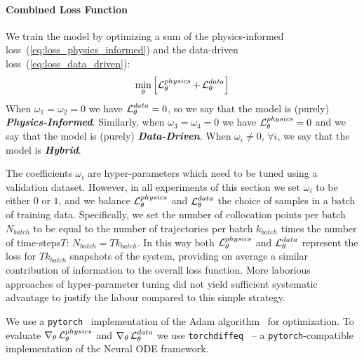\paragraph{Combined Loss Function} We train the model by optimizing a sum of the physics-informed loss~(\ref{eq:loss_physics_informed}) and the data-driven loss~(\ref{eq:loss_data_driven}):
\begin{equation}
    \label{eq:loss_combined}
    \min_\theta \left[\operatorname{\mathcal{L}}^{physics}_\theta + \operatorname{\mathcal{L}}^{data}_\theta\right]  
\end{equation}
When $\omega_1 = \omega_2 = 0$ we have $\operatorname{\mathcal{L}}^{data}_\theta = 0$, so we say that the model is (purely) \textit{\textbf{Physics-Informed}}. Similarly, when $\omega_3 = \omega_4 = 0$ we have $\operatorname{\mathcal{L}}^{physics}_\theta = 0$ and we say that the model is (purely) \textit{\textbf{Data-Driven}}. When $\omega_i \neq 0, \, \forall i$, we say that the model is \textit{\textbf{Hybrid}}. 

The coefficients $\omega_i$ are hyper-parameters which need to be tuned using a validation dataset. However, in all experiments of this section we set $\omega_i$ to be either $0$ or $1$, and we balance $\operatorname{\mathcal{L}}^{physics}_\theta$ and $\operatorname{\mathcal{L}}^{data}_\theta$ the choice of samples in a batch of training data. Specifically, we set the number of collocation points per batch $N_{batch}$ to be equal to the number of trajectories per batch $k_{batch}$ times the number of time-steps$T$: $N_{batch} = Tk_{batch}$. In this way both $\operatorname{\mathcal{L}}^{physics}_\theta$ and $\operatorname{\mathcal{L}}^{data}_\theta$ represent the loss for $Tk_{batch}$ snapshots of the system, providing on average a similar contribution of information to the overall loss function. More laborious approaches of hyper-parameter tuning did not yield sufficient systematic advantage to justify the labour compared to this simple strategy.

We use a \texttt{pytorch}~\citep{NEURIPS2019_9015} implementation of the Adam algorithm~\citep{kingma2014adam} for optimization. To evaluate $\nabla_\theta \operatorname{\mathcal{L}}^{physics}_\theta$ and $\nabla_\theta \operatorname{\mathcal{L}}^{data}_\theta$ we use \texttt{torchdiffeq}~\citep{chen2018neural} -- a \texttt{pytorch}-compatible implementation of the Neural ODE framework. 

